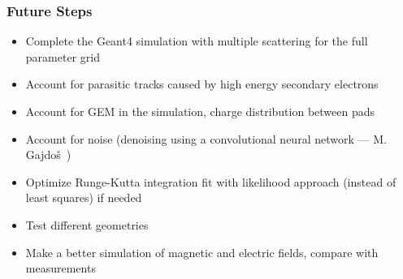 \documentclass{beamer}
\begin{document}
	\begin{frame}
		\frametitle{Future Steps}
		\begin{itemize}
			\item Complete the Geant4 simulation with multiple scattering for the full parameter grid
			\item Account for parasitic tracks caused by high energy secondary electrons
			\item Account for GEM in the simulation, charge distribution between pads
			\item Account for noise (denoising using a convolutional neural network --- M. Gajdoš~\cite{Gajdoš_2025})
			\item Optimize Runge-Kutta integration fit with likelihood approach (instead of least squares) if needed
			\item Test different geometries
			\item Make a better simulation of magnetic and electric fields, compare with measurements
		\end{itemize}
	\end{frame}
\end{document}
